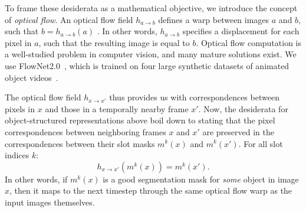\documentclass{article}
\newcommand{\jd}[1]{\textcolor{orange}{[DJ: #1]}}
\begin{document}
To frame these desiderata as a mathematical objective, we introduce the concept of \emph{optical flow}. An optical flow field  $h_{a\rightarrow b}$ defines a warp between images $a$ and $b$, such that $b=h_{a\rightarrow b}(a)$ . In other words, $h_{a\rightarrow b}$ specifies a displacement for each pixel in $a$, such that the resulting image is equal to $b$. Optical flow computation is a well-studied problem in computer vision, and many mature solutions exist. We use FlowNet2.0~\cite{flownet2}, which is trained on four large synthetic datasets of animated object videos~\cite{flying3d, flyingchair,chairsd,sintel}. %

The optical flow field $h_{x\rightarrow x'}$ thus provides us with correspondences between pixels in $x$ and those in a temporally nearby frame $x'$.  
Now, the desiderata for object-structured representations above boil down to stating that the pixel correspondences between neighboring frames $x$ and $x'$ are preserved in the correspondences between their slot masks $m^k(x)$ and $m^k(x')$. For all slot indices $k$:
\begin{equation}
    h_{x\rightarrow x'}(m^k(x)) = m^k(x'). \label{eq:desideratum}
\end{equation}
In other words, if $m^k(x)$ is a good segmentation mask for \emph{some} object in image $x$, then it maps to the next timestep through the same optical flow warp as the input images themselves. %



\end{document}
